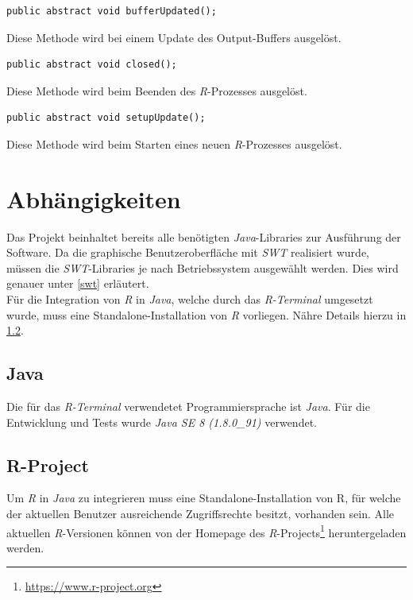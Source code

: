 \documentclass[a4paper, 12pt]{report} %
\begin{document}
\lstset{language=Java}
\begin{lstlisting}[frame=single]
public abstract void bufferUpdated();
\end{lstlisting}
Diese Methode wird bei einem Update des Output-Buffers ausgelöst.\\

\lstset{language=Java}
\begin{lstlisting}[frame=single]
public abstract void closed();
\end{lstlisting}
Diese Methode wird beim Beenden des \textit{R}-Prozesses ausgelöst.\\

\lstset{language=Java}
\begin{lstlisting}[frame=single]
public abstract void setupUpdate();
\end{lstlisting}
Diese Methode wird beim Starten eines neuen \textit{R}-Prozesses ausgelöst.


\section{Abhängigkeiten} \label{Abhängigkeiten}

Das Projekt beinhaltet bereits alle benötigten \textit{Java}-Libraries zur Ausführung der Software. 
Da die graphische Benutzeroberfläche mit \textit{SWT} realisiert wurde, müssen die \textit{SWT}-Libraries je nach Betriebssystem ausgewählt werden. Dies wird genauer unter \ref{swt} erläutert.\\

Für die Integration von \textit{R} in \textit{Java}, welche durch das \textit{R-Terminal} umgesetzt wurde, muss eine Standalone-Installation von \textit{R} vorliegen. Nähre Details hierzu in \ref{r}.
 
\subsection{Java}

Die für das \textit{R-Terminal} verwendetet Programmiersprache ist \textit{Java}. Für die Entwicklung und Tests wurde \textit{Java SE 8 (1.8.0\_91)} verwendet.
 
\subsection{R-Project} \label{r}

Um \textit{R} in \textit{Java} zu integrieren muss eine Standalone-Installation von R, für welche der aktuellen Benutzer ausreichende Zugriffsrechte besitzt, vorhanden sein. 
Alle aktuellen \textit{R}-Versionen können von der Homepage des \textit{R}-Projects\footnote{\url{https://www.r-project.org}} heruntergeladen werden. 
\end{document}
